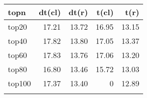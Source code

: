 \begin{tabular}{lrrrr}

topn & dt(cl) & dt(r) & t(cl) & t(r) \\
\toprule
top20 & 17.21 & 13.72 & 16.95 & 13.15 \\
top40 & 17.82 & 13.80 & 17.05 & 13.37 \\
top60 & 17.83 & 13.76 & 17.06 & 13.20 \\
top80 & 16.80 & 13.46 & 15.72 & 13.03 \\
top100 & 17.37 & 13.40 & 0 & 12.89 \\
\bottomrule
\small
\centering
\label{table:htes-topn}

\end{tabular}